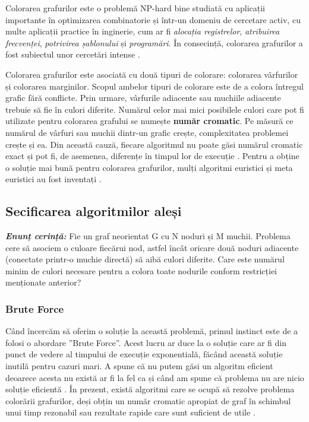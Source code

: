 \documentclass[runningheads]{llncs}
\begin{document}
Colorarea grafurilor este o problemă NP-hard bine studiată cu aplicații 
importante în optimizarea combinatorie și într-un domeniu de cercetare activ, cu 
multe aplicații practice \cite{4} în inginerie, cum ar fi \textit{alocația registrelor}, 
\textit{atribuirea frecvenței}, \textit{potrivirea șablonului} și \textit{programări}. 
În consecință, colorarea grafurilor a fost subiectul unor cercetări intense \cite{5} \cite{2}.

Colorarea grafurilor este asociată cu două tipuri de colorare: colorarea vârfurilor 
și colorarea marginilor. Scopul ambelor tipuri de colorare este de a colora întregul grafic fără
conflicte. Prin urmare, vârfurile adiacente sau muchiile adiacente trebuie
să fie în culori diferite. Numărul celor mai mici
posibilele culori care pot fi utilizate pentru colorarea grafului se numește 
\textbf{număr cromatic}.
Pe măsură ce numărul de vârfuri sau muchii dintr-un grafic crește,
complexitatea problemei crește și ea. Din această cauză, fiecare
algoritmul nu poate găsi numărul cromatic exact  
și pot fi, de asemenea, diferențe în timpul lor de execuție \cite{6}. Pentru a obține 
o soluție mai bună pentru colorarea grafurilor, mulți algoritmi euristici și meta
euristici au fost inventați \cite{7}.
% 
\subsection{Secificarea algoritmilor aleși}

\textbf{\textit{Enunț cerință:}} Fie un graf neorientat G cu N noduri și M muchii. Problema cere să asociem o culoare 
fiecărui nod, astfel încât oricare două noduri adiacente (conectate printr-o muchie directă) 
să aibă culori diferite. Care este numărul minim de culori necesare pentru a colora 
toate nodurile conform restricției menționate anterior? \cite{8}

\subsubsection{Brute Force}
Când încercăm să oferim o soluție la această problemă, primul instinct este de a
folosi o abordare ”Brute Force”. Acest lucru ar duce la o soluție care ar fi 
din punct de vedere al timpului de execuție exponentială, făcând această soluție 
inutilă pentru cazuri mari. A spune că nu putem găsi un algoritm eficient 
deoarece acesta nu există ar fi la fel ca și când am spune că problema nu are 
nicio soluție eficientă \cite{9}.
În prezent, există algoritmi care se ocupă să rezolve problema colorării grafurilor, 
deși obțin un număr cromatic apropiat de graf în schimbul unui timp
rezonabil sau rezultate rapide care sunt suficient de utile \cite{10}.
\end{document}
